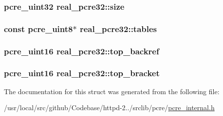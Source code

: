 \subsubsection[{\texorpdfstring{size}{size}}]{\setlength{\rightskip}{0pt plus 5cm}pcre\+\_\+uint32 real\+\_\+pcre32\+::size}\hypertarget{structreal__pcre32_a093cbf2eb3f2ef8e0408ca9bfb2ea871}{}\label{structreal__pcre32_a093cbf2eb3f2ef8e0408ca9bfb2ea871}
\subsubsection[{\texorpdfstring{tables}{tables}}]{\setlength{\rightskip}{0pt plus 5cm}const {\bf pcre\+\_\+uint8}$\ast$ real\+\_\+pcre32\+::tables}\hypertarget{structreal__pcre32_a7b35b7b8eaff12876cf34fb4aa018705}{}\label{structreal__pcre32_a7b35b7b8eaff12876cf34fb4aa018705}
\subsubsection[{\texorpdfstring{top\+\_\+backref}{top_backref}}]{\setlength{\rightskip}{0pt plus 5cm}pcre\+\_\+uint16 real\+\_\+pcre32\+::top\+\_\+backref}\hypertarget{structreal__pcre32_a1e46f2e6e8fe9e7687c125e20bed60d3}{}\label{structreal__pcre32_a1e46f2e6e8fe9e7687c125e20bed60d3}
\subsubsection[{\texorpdfstring{top\+\_\+bracket}{top_bracket}}]{\setlength{\rightskip}{0pt plus 5cm}pcre\+\_\+uint16 real\+\_\+pcre32\+::top\+\_\+bracket}\hypertarget{structreal__pcre32_a30544e16d634bb880cd9c330ab302fb8}{}\label{structreal__pcre32_a30544e16d634bb880cd9c330ab302fb8}


The documentation for this struct was generated from the following file\+:\begin{DoxyCompactItemize}
\item 
/usr/local/src/github/\+Codebase/httpd-\/2../srclib/pcre/\hyperlink{pcre__internal_8h}{pcre\+\_\+internal.\+h}\end{DoxyCompactItemize}
